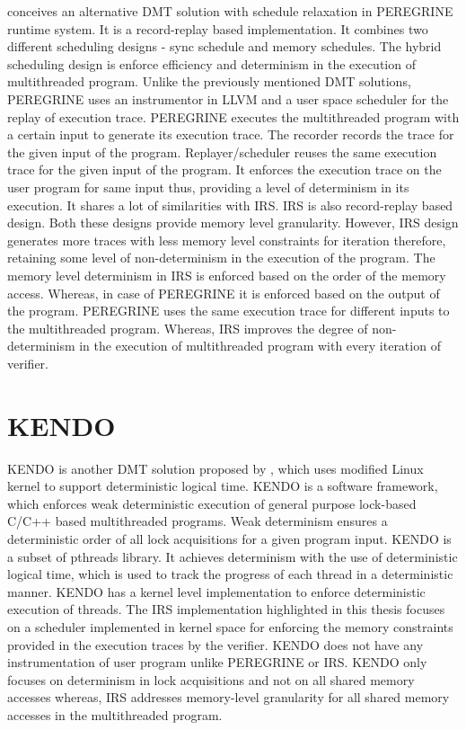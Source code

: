 \citet{peregrine} conceives an alternative DMT solution with schedule relaxation in PEREGRINE runtime system. 
It is a record-replay based implementation. 
It combines two different scheduling designs - sync schedule and memory schedules. 
The hybrid scheduling design is enforce efficiency and determinism in the execution of multithreaded program. 
Unlike the previously mentioned DMT solutions, PEREGRINE uses an instrumentor in LLVM and a user space scheduler for the replay of execution trace. 
PEREGRINE executes the multithreaded program with a certain input to generate its execution trace. 
The recorder records the trace for the given input of the program. 
Replayer/scheduler reuses the same execution trace for the given input of the program. 
It enforces the execution trace on the user program for same input thus, providing a level of determinism in its execution. 
It shares a lot of similarities with IRS. 
IRS is also record-replay based design. 
Both these designs provide memory level granularity. 
However, IRS design generates more traces with less memory level constraints for iteration therefore, retaining some level of non-determinism in the execution of the program. 
The memory level determinism in IRS is enforced based on the order of the memory access. Whereas, in case of PEREGRINE it is enforced based on the output of the program. 
PEREGRINE uses the same execution trace for different inputs to the multithreaded program. 
Whereas, IRS improves the degree of non-determinism in the execution of multithreaded program with every iteration of verifier.

\section{KENDO}

KENDO is another DMT solution proposed by \citet{kendo}, which uses modified Linux kernel to support deterministic logical time. 
KENDO is a software framework, which enforces weak deterministic execution of general purpose lock-based C/C++ based multithreaded programs.  
Weak determinism ensures a deterministic order of all lock acquisitions for a given program input.   
KENDO is a subset of pthreads library. 
It achieves determinism with the use of deterministic logical time, which is used to track the progress of each thread in a deterministic manner. 
KENDO has a kernel level implementation to enforce deterministic execution of threads. 
The IRS implementation highlighted in this thesis focuses on a scheduler implemented in kernel space for enforcing the memory constraints provided in the execution traces by the verifier. 
KENDO does not have any instrumentation of user program unlike PEREGRINE or IRS. 
KENDO only focuses on determinism in lock acquisitions and not on all shared memory accesses whereas, IRS addresses memory-level granularity for all shared memory accesses in the multithreaded program.

